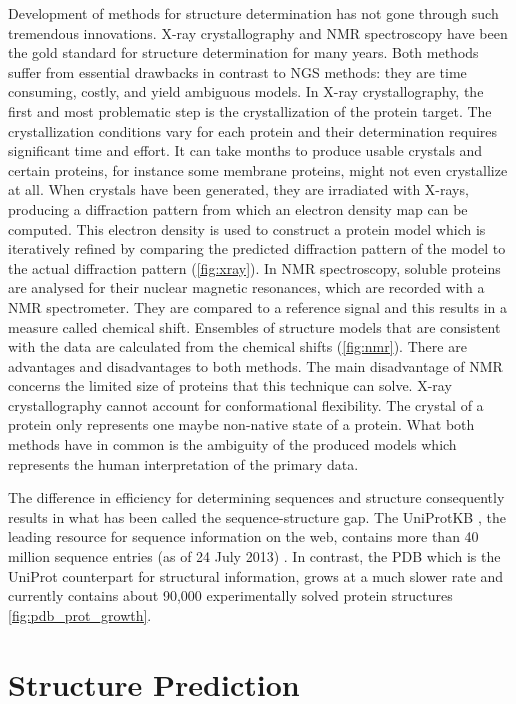 \documentclass[12pt,a4paper,twoside]{book}
\begin{document}
Development of methods for structure determination has not gone through
such tremendous innovations. X-ray crystallography and \ac{NMR}
spectroscopy have been the gold standard for structure determination for
many years. Both methods suffer from essential drawbacks in contrast to
\ac{NGS} methods: they are time consuming, costly, and yield ambiguous
models. In X-ray crystallography, the first and most problematic step is
the crystallization of the protein target. The crystallization
conditions vary for each protein and their determination requires
significant time and effort. It can take months to produce usable
crystals and certain proteins, for instance some membrane proteins,
might not even crystallize at all. When crystals have been generated,
they are irradiated with X-rays, producing a diffraction pattern from
which an electron density map can be computed. This electron density is
used to construct a protein model which is iteratively refined by
comparing the predicted diffraction pattern of the model to the actual
diffraction pattern (\autoref{fig:xray}). In \ac{NMR} spectroscopy,
soluble proteins are analysed for their nuclear magnetic resonances,
which are recorded with a \ac{NMR} spectrometer. They are compared to a
reference signal and this results in a measure called chemical shift.
Ensembles of structure models that are consistent with the data are
calculated from the chemical shifts (\autoref{fig:nmr}). There are
advantages and disadvantages to both methods. The main disadvantage of
\ac{NMR} concerns the limited size of proteins that this technique can
solve. X-ray crystallography cannot account for conformational
flexibility. The crystal of a protein only represents one maybe
non-native state of a protein. What both methods have in common is the
ambiguity of the produced models which represents the human
interpretation of the primary data.\citep{Petsko2009,Gu2009}

The difference in efficiency for determining sequences and structure
consequently results in what has been called the sequence-structure gap.
The UniProtKB \citep{TheUniProtConsortium2013}, the leading resource for
sequence information on the web, contains more than 40 million sequence
entries (as of 24 July 2013) \citep{StatisticsSP, statisticsT}. In
contrast, the \ac{PDB} \citep{Berman2000} which is the UniProt
counterpart for structural information, grows at a much slower rate and
currently contains about 90,000 experimentally solved protein structures
\autoref{fig:pdb_prot_growth}.

\section{Structure Prediction}\label{structure-prediction}
\end{document}
